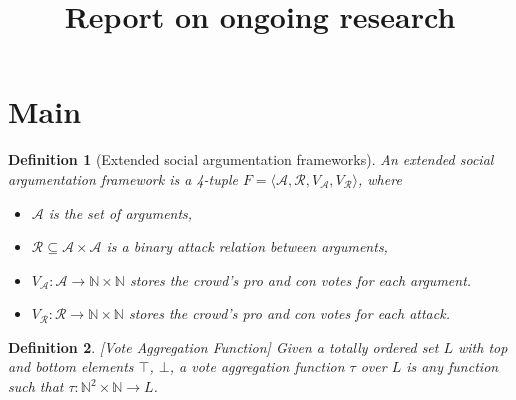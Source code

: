 \documentclass{article}
\date{ }
\newtheorem{definition}{Definition}
\newcommand{\nat}{\mathbb{N}}   %
\newcommand{\args}{\mathcal{A}} %
\newcommand{\att}{\mathcal{R}}  %
\newcommand{\valueset}{L}
\newcommand{\varg}{V_{\args}}   %
\newcommand{\vatt}{V_{\att}}   %
\newcommand{\safid}{F}               %
\newcommand{\saf}{\safid = \safbody} %
\newcommand{\safbody}{\langle \args, \att, \varg, \vatt \rangle} %
\begin{document}
\title{Report on ongoing research}

\maketitle






\section{Main}


\begin{definition}[Extended social argumentation frameworks]
An \emph{extended social argumentation framework} is a 4-tuple $\saf$, where
\begin{itemize}
  \item $\args$ is the set of arguments,
  \item $\att \subseteq \args \times \args$ is a binary attack relation between arguments,
  \item $\varg : \args \to \nat \times \nat$ stores the crowd's pro and con votes for each argument.
  \item $\vatt : \att \to \nat \times \nat$ stores the crowd's pro and con votes for each attack.
\end{itemize}
\end{definition}

\begin{definition}
\label{def:voteAgg}
[Vote Aggregation Function]
Given a totally ordered set $\valueset$ with top and bottom elements $\top$, $\bot$, a vote aggregation function $\tau$ over $\valueset$ is any function such that $\tau :\nat^{2} \times \nat \to L$.
\end{definition}
\end{document}
